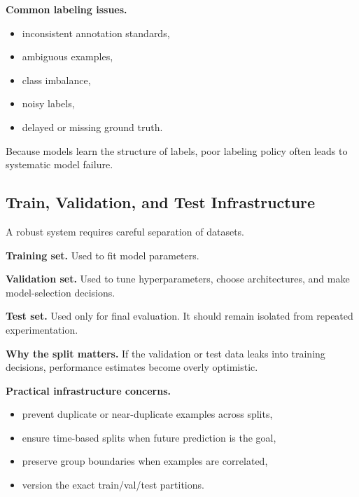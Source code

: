 \medskip

\noindent
\textbf{Common labeling issues.}
\begin{itemize}
    \item inconsistent annotation standards,
    \item ambiguous examples,
    \item class imbalance,
    \item noisy labels,
    \item delayed or missing ground truth.
\end{itemize}

\medskip

\noindent
Because models learn the structure of labels, poor labeling policy often leads to systematic model failure.

\subsection{Train, Validation, and Test Infrastructure}

A robust system requires careful separation of datasets.

\medskip

\noindent
\textbf{Training set.}
Used to fit model parameters.

\medskip

\noindent
\textbf{Validation set.}
Used to tune hyperparameters, choose architectures, and make model-selection decisions.

\medskip

\noindent
\textbf{Test set.}
Used only for final evaluation. It should remain isolated from repeated experimentation.

\medskip

\noindent
\textbf{Why the split matters.}
If the validation or test data leaks into training decisions, performance estimates become overly optimistic.

\medskip

\noindent
\textbf{Practical infrastructure concerns.}
\begin{itemize}
    \item prevent duplicate or near-duplicate examples across splits,
    \item ensure time-based splits when future prediction is the goal,
    \item preserve group boundaries when examples are correlated,
    \item version the exact train/val/test partitions.
\end{itemize}

